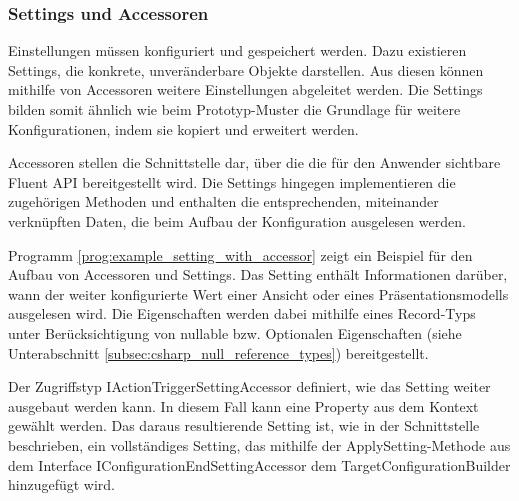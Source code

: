 \subsubsection{Settings und Accessoren}
Einstellungen müssen konfiguriert und gespeichert werden. Dazu existieren Settings, die konkrete, unveränderbare Objekte darstellen. Aus diesen können mithilfe von Accessoren weitere Einstellungen abgeleitet werden. Die Settings bilden somit ähnlich wie beim Prototyp-Muster \cite{gamma1995design} die Grundlage für weitere Konfigurationen, indem sie kopiert und erweitert werden.

Accessoren stellen die Schnittstelle dar, über die die für den Anwender sichtbare Fluent API bereitgestellt wird. Die Settings hingegen implementieren die zugehörigen Methoden und enthalten die entsprechenden, miteinander verknüpften Daten, die beim Aufbau der Konfiguration ausgelesen werden.

Programm \ref{prog:example_setting_with_accessor} zeigt ein Beispiel für den Aufbau von Accessoren und Settings. Das Setting enthält Informationen darüber, wann der weiter konfigurierte Wert einer Ansicht oder eines Präsentationsmodells ausgelesen wird. Die Eigenschaften werden dabei mithilfe eines Record-Typs \cite{microsoft_csharp_records} unter Berücksichtigung von nullable bzw. Optionalen Eigenschaften (siehe Unterabschnitt \ref{subsec:csharp_null_reference_types}) bereitgestellt.

Der Zugriffstyp IActionTriggerSettingAccessor definiert, wie das Setting weiter ausgebaut werden kann. In diesem Fall kann eine Property aus dem Kontext gewählt werden. Das daraus resultierende Setting ist, wie in der Schnittstelle beschrieben, ein vollständiges Setting, das mithilfe der ApplySetting-Methode aus dem Interface IConfigurationEndSettingAccessor dem TargetConfigurationBuilder hinzugefügt wird.


